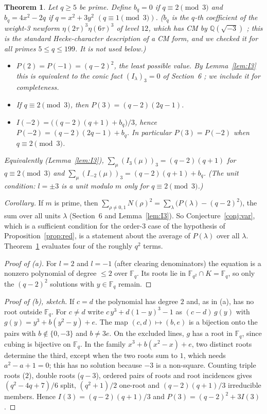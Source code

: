 \documentclass[11pt]{article}
\newtheorem{theorem}{Theorem}
\begin{document}
\begin{theorem}\label{thm:gal}
Let $q\ge5$ be prime. Define $b_q=0$ if $q\equiv2\pmod3$ and $b_q=4x^2-2q$ if $q=x^2+3y^2$ $(q\equiv1\pmod3)$.
($b_q$ is the $q$-th coefficient of the weight-3 newform $\eta(2\tau)^3\eta(6\tau)^3$ of level $12$, which has CM by $\mathbb Q(\sqrt{-3})$ \cite{LM}; this is the standard
Hecke-character description of a CM form, and we checked it for all primes $5\le q\le199$. It is not used below.)
\begin{itemize}
\item[(a)] $P(2)=P(-1)=(q-2)^2$, the least possible value. By Lemma~\ref{lem:I3} this is equivalent to the conic fact $(I_\lambda)_3=0$ of Section~6 \cite{JV,Pi}; we include it for completeness.
\item[(b)] If $q\equiv2\pmod3$, then $P(3)=(q-2)(2q-1)$.
\item[(c)] $I(-2)=\big((q-2)(q+1)+b_q\big)/3$, hence $P(-2)=(q-2)(2q-1)+b_q$. In particular $P(3)=P(-2)$ when $q\equiv2\pmod3$.
\end{itemize}
Equivalently (Lemma~\ref{lem:I3}), $\sum_\mu(I_3(\mu))_3=(q-2)(q+1)$ for $q\equiv2\pmod3$ and $\sum_\mu(I_{-2}(\mu))_3=(q-2)(q+1)+b_q$. (The unit condition: $l=\pm3$ is a unit modulo $m$ only for $q\equiv2\pmod3$.)
\end{theorem}
\noindent\emph{Corollary.} If $m$ is prime, then $\sum_{\rho\ne0,1}N(\rho)^2=\sum_{\lambda}\bigl(P(\lambda)-(q-2)^2\bigr)$, the sum over all units $\lambda$ (Section~6 and Lemma~\ref{lem:I3}).
So Conjecture~\ref{conj:var}, which is a sufficient condition for the order-3 case of the hypothesis of Proposition~\ref{prop:red}, is a statement about the average of $P(\lambda)$ over all $\lambda$.
Theorem~\ref{thm:gal} evaluates four of the roughly $q^2$ terms.

\begin{proof}[Proof of (a)]
For $l=2$ and $l=-1$ (after clearing denominators) the equation is a nonzero polynomial of degree $\le2$ over $\mathbb F_q$. Its roots lie in
$\mathbb F_{q^2}\cap K=\mathbb F_q$, so only the $(q-2)^2$ solutions with $y\in\mathbb F_q$ remain.
\end{proof}

\begin{proof}[Proof of (b), sketch]
If $c=d$ the polynomial has degree $2$ and, as in (a), has no root outside $\mathbb F_q$. For $c\ne d$ write $c\,y^3+d(1-y)^3-1$ as $(c-d)\,g(y)$ with $g(y)=y^3+b(y^2-y)+e$. The map $(c,d)\mapsto(b,e)$ is a bijection onto the pairs with
$b\notin\{0,-3\}$ and $b\ne3e$. On the excluded lines, $g$ has a root in $\mathbb F_q$, since cubing is bijective on $\mathbb F_q$. In the family
$x^3+b(x^2-x)+e$, two distinct roots determine the third, except when the two roots sum to $1$, which needs $a^2-a+1=0$; this has no solution because
$-3$ is a non-square. Counting triple roots ($2$), double roots ($q-3$), ordered pairs of roots and root incidences gives
$(q^2-4q+7)/6$ split, $(q^2+1)/2$ one-root and $(q-2)(q+1)/3$ irreducible members. Hence $I(3)=(q-2)(q+1)/3$ and $P(3)=(q-2)^2+3I(3)$.
\end{proof}
\end{document}
